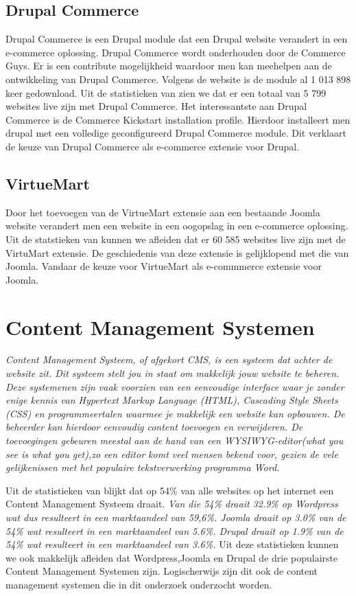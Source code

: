 \subsection{Drupal Commerce}
Drupal Commerce is een Drupal module dat een Drupal website verandert in een e-commerce oplossing. Drupal Commerce wordt onderhouden door de Commerce Guys. Er is een contribute mogelijkheid waardoor men kan meehelpen aan de ontwikkeling van Drupal Commerce. Volgens de \textcite{Drupal2018a} website is de module al 1 013 898 keer gedownload. Uit de statistieken van \textcite{Builtwith2018b} zien we dat er een totaal van 5 799 websites live zijn met Drupal Commerce. Het interessantste aan Drupal Commerce is de Commerce Kickstart installation profile. Hierdoor installeert men drupal met een volledige geconfigureerd Drupal Commerce module. Dit verklaart de keuze van Drupal Commerce als e-commerce extensie voor Drupal.
\subsection{VirtueMart}
Door het toevoegen van de VirtueMart extensie aan een bestaande Joomla website verandert men een  website in een oogopslag in een e-commerce oplossing. Uit de statstieken van \textcite{Builtwith2018c} kunnen we afleiden dat er 60 585 websites live zijn met de VirtuMart extensie. De geschiedenis van deze extensie is gelijklopend met die van Joomla. Vandaar de keuze voor VirtueMart als e-commmerce extensie voor Joomla.

\section{Content Management Systemen}
\textit{Content Management Systeem, of afgekort CMS, is een systeem dat achter de website zit. Dit systeem stelt jou in staat om makkelijk jouw website te beheren. Deze systemenen zijn vaak voorzien van een eenvoudige interface waar je zonder enige kennis van Hypertext Markup Language (HTML), Cascading Style Sheets (CSS) en programmeertalen waarmee je makkelijk een website kan opbouwen. De beheerder kan hierdoor eenvoudig content toevoegen en verwijderen. De toevoegingen gebeuren meestal aan de hand van een WYSIWYG-editor(what you see is what you get),zo een editor komt veel mensen bekend voor, gezien de vele gelijkenissen met het populaire tekstverwerking programma Word.} \autocite{forresult2014,wphandleiding2015}


Uit de statistieken van \textcite{Builtwith2018} blijkt dat op 54\% van alle websites op het internet een Content Management Systeem draait.\textit{ Van die 54\% draait 32.9\% op Wordpress wat dus resulteert in een marktaandeel van 59,6\%. Joomla draait op 3.0\% van de 54\% wat resulteert in een marktaandeel van 5.6\%. Drupal draait op 1.9\% van de 54\% wat resulteert in een marktaandeel van 3.6\%.} \autocite{Builtwith2018} Uit deze statistieken kunnen we ook makkelijk afleiden dat Wordpress,Joomla en Drupal de drie populairste Content Management Systemen zijn. Logischerwijs zijn dit ook de content management systemen die in dit onderzoek onderzocht worden. 


